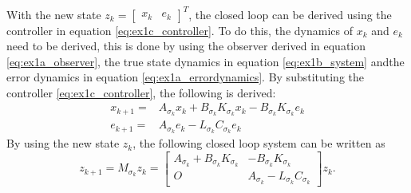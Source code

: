 With the new state $z_k = \begin{bmatrix} x_k & e_k \end{bmatrix}^T$, the closed loop can be derived using the controller in equation \eqref{eq:ex1c_controller}. To do this, the dynamics of $x_k$ and $e_k$ need to be derived, this is done by using the observer derived in equation \eqref{eq:ex1a_observer}, the true state dynamics in equation \eqref{eq:ex1b_system} andthe error dynamics in equation \eqref{eq:ex1a_errordynamics}. By substituting the controller \eqref{eq:ex1c_controller}, the following is derived:
\begin{equation}
\begin{matrix}
    x_{k+1} =& A_{\sigma_k} x_k + B_{\sigma_k} K_{\sigma_k} x_k - B_{\sigma_k} K_{\sigma_k} e_k \\
    e_{k+1} =& A_{\sigma_k} e_k - L_{\sigma_k} C_{\sigma_k} e_k
    \end{matrix}
    \label{eq:ex1c_dynamics}
\end{equation}
By using the new state $z_k$, the following closed loop system can be written as
\begin{equation}
    z_{k+1} = M_{\sigma_k} z_k = \begin{bmatrix} A_{\sigma_k} + B_{\sigma_k} K_{\sigma_k} & -B_{\sigma_k} K_{\sigma_k} \\ O & A_{\sigma_k} - L_{\sigma_k} C_{\sigma_k} \end{bmatrix} z_k.
    \label{eq:ex1c_closedloop}
\end{equation}


